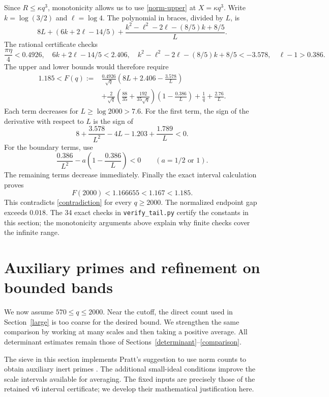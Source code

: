 \documentclass[11pt]{article}
\begin{document}
Since $R\le\kappa q^3$, monotonicity allows us to use
\eqref{norm-upper} at $X=\kappa q^3$. Write $k=\log(3/2)$ and
$\ell=\log4$. The polynomial in braces, divided by $L$, is
\[
 8L+(6k+2\ell-14/5)
       +\frac{k^2-\ell^2-2\ell-(8/5)k+8/5}{L}.
\]
The rational certificate checks
\[
 \frac{\pi\eta}4<0.4926,\quad
 6k+2\ell-14/5<2.406,\quad
 k^2-\ell^2-2\ell-(8/5)k+8/5<-3.578,\quad
 \ell-1>0.386.
\]
The upper and lower bounds would therefore require
\begin{equation}\label{contradiction}
\begin{aligned}
 1.185<F(q):={}&
 \frac{0.4926}{\sqrt q}\left(8L+2.406-\frac{3.578}{L}\right)
 \\
 &+\frac2{\sqrt q}\left(\frac{88}{35}+\frac{192}{35\sqrt q}\right)
        \left(1-\frac{0.386}{L}\right)
 +\frac1q+\frac{2.76}{L}.
\end{aligned}
\end{equation}
Each term decreases for $L\ge\log2000>7.6$. For the first term,
the sign of the derivative with respect to $L$ is the sign of
\[
 8+\frac{3.578}{L^2}-4L-1.203+\frac{1.789}{L}<0.
\]
For the boundary terms, use
\[
 \frac{0.386}{L^2}-a\left(1-\frac{0.386}{L}\right)<0
 \qquad(a=1/2\text{ or }1).
\]
The remaining terms decrease immediately. Finally the exact interval
calculation proves
\[
 F(2000)<1.166655<1.167<1.185.
\]
This contradicts \eqref{contradiction} for every $q\ge2000$.
The normalized endpoint gap exceeds $0.018$.
The 34 exact checks in \texttt{verify\_tail.py} certify the constants
in this section; the monotonicity arguments above explain why finite
checks cover the infinite range.

\section{Auxiliary primes and refinement on bounded bands}\label{bands}\label{affine}
We now assume \(570\le q\le2000\). Near the cutoff, the direct
count used in Section~\ref{large} is too coarse for the desired bound.
We strengthen the same comparison by working at many scales and then
taking a positive average. All determinant estimates remain those of
Sections~\ref{determinant}--\ref{comparison}.

The sieve in this section implements Pratt's suggestion to use norm
counts to obtain auxiliary inert primes \cite{pratt}. The additional
small-ideal conditions improve the scale intervals available for averaging.
The fixed inputs are precisely those of the retained v6 interval
certificate; we develop their mathematical justification here.
\end{document}
